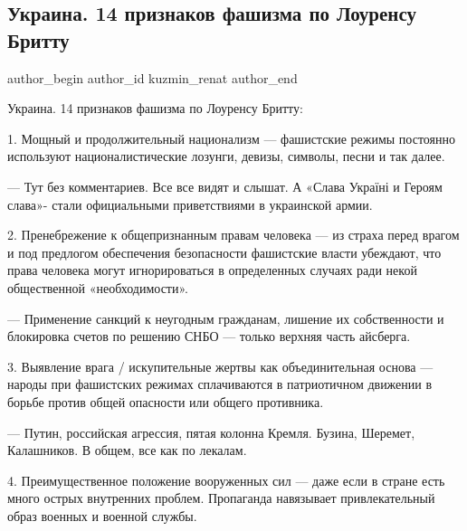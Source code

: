  
 
 
 
 
 
\subsection{Украина. 14 признаков фашизма по Лоуренсу Бритту}
\label{sec:05_01_2022.fb.kuzmin_renat.1.ukraina_fashizm}
 
\ifcmt
 author_begin
   author_id kuzmin_renat
 author_end
\fi

Украина. 14 признаков фашизма по Лоуренсу Бритту: 

1. Мощный и продолжительный национализм — фашистские режимы постоянно
используют националистические лозунги, девизы, символы, песни и так далее. 

— Тут без комментариев. Все все видят и слышат. А «Слава Україні и Героям
слава»- стали официальными приветствиями в украинской армии. 


2. Пренебрежение к общепризнанным правам человека — из страха перед врагом и
под предлогом обеспечения безопасности фашистские власти убеждают, что права
человека могут игнорироваться в определенных случаях ради некой общественной
«необходимости». 

— Применение санкций к неугодным гражданам, лишение их собственности и
блокировка счетов по решению СНБО — только верхняя часть айсберга. 

3. Выявление врага / искупительные жертвы как объединительная основа — народы
при фашистских режимах сплачиваются в патриотичном движении в борьбе против
общей опасности или общего противника. 

— Путин, российская агрессия, пятая колонна Кремля. Бузина, Шеремет,
Калашников. В общем, все как по лекалам. 

4. Преимущественное положение вооруженных сил — даже если в стране есть много
острых внутренних проблем. Пропаганда навязывает привлекательный образ военных
и военной службы.

